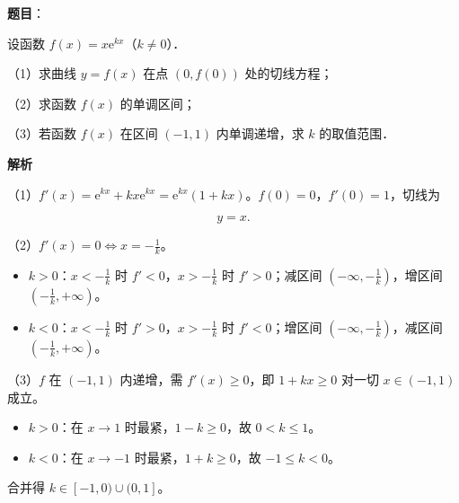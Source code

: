 \begin{answer}

\textbf{题目}：

设函数 $f(x)=x\mathrm e^{kx}$（$k\neq0$）．

（1）求曲线 $y=f(x)$ 在点 $(0,f(0))$ 处的切线方程；

（2）求函数 $f(x)$ 的单调区间；

（3）若函数 $f(x)$ 在区间 $(-1,1)$ 内单调递增，求 $k$ 的取值范围．

\textbf{解析}

（1）$f'(x)=\mathrm e^{kx}+kx\mathrm e^{kx}=\mathrm e^{kx}(1+kx)$。$f(0)=0$，$f'(0)=1$，切线为

\nopagebreak[4]
\[y=x .\]

（2）$f'(x)=0\iff x=-\frac1k$。

\begin{itemize}
\item $k>0$：$x<-\frac1k$ 时 $f'<0$，$x>-\frac1k$ 时 $f'>0$；减区间 $\left(-\infty,-\frac1k\right)$，增区间 $\left(-\frac1k,+\infty\right)$。
\item $k<0$：$x<-\frac1k$ 时 $f'>0$，$x>-\frac1k$ 时 $f'<0$；增区间 $\left(-\infty,-\frac1k\right)$，减区间 $\left(-\frac1k,+\infty\right)$。
\end{itemize}

（3）$f$ 在 $(-1,1)$ 内递增，需 $f'(x)\geqslant0$，即 $1+kx\geqslant0$ 对一切 $x\in(-1,1)$ 成立。

\begin{itemize}
\item $k>0$：在 $x\to1$ 时最紧，$1-k\geqslant0$，故 $0<k\leqslant1$。
\item $k<0$：在 $x\to-1$ 时最紧，$1+k\geqslant0$，故 $-1\leqslant k<0$。
\end{itemize}

合并得 $k\in[-1,0)\cup(0,1]$。


\end{answer}
